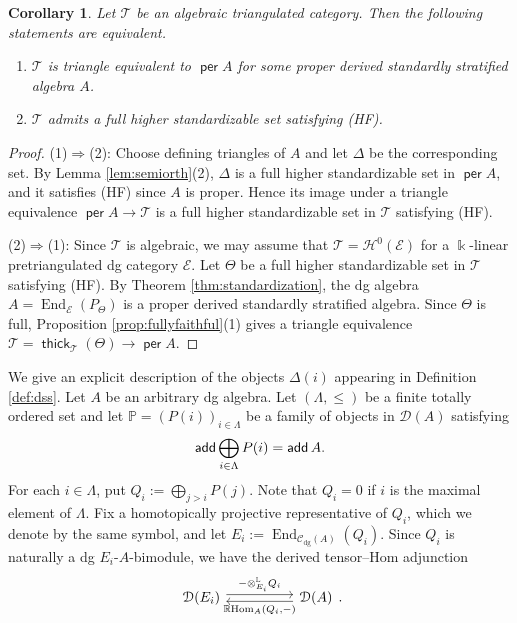 \documentclass[a4paper,reqno,11pt]{amsart}
\numberwithin{equation}{section}
\newtheorem{corollary}[theorem]{Corollary}
\theoremstyle{definition}
\newcommand{\C}{\mathcal{C}}
\newcommand{\D}{\mathcal{D}}
\newcommand{\E}{\mathcal{E}}
\renewcommand{\H}{\mathcal{H}}
\newcommand{\T}{\mathcal{T}}
\newcommand{\LL}{\mathbb{L}}
\newcommand{\PP}{\mathbb{P}}
\newcommand{\bte}{\Theta}
\newcommand{\bde}{\Delta}
\newcommand{\kk}{\Bbbk}
\DeclareMathOperator{\add}{\mathsf{add}}
\DeclareMathOperator{\thick}{\mathsf{thick}}
\DeclareMathOperator{\per}{\mathsf{per}}
\DeclareMathOperator{\End}{End}
\DeclareMathOperator{\RHom}{\mathbb{R}Hom}
\newcommand{\dgmod}{\C_{\mathrm{dg}}}
\begin{document}
\begin{corollary}\label{cor:tri_char}
Let $\T$ be an algebraic triangulated category.
Then the following statements are equivalent.
\begin{enumerate}
\item $\T$ is triangle equivalent to $\per A$ for some proper derived standardly stratified algebra $A$.
\item $\T$ admits a full higher standardizable set satisfying (HF).
\end{enumerate}
\end{corollary}
\begin{proof}
(1)$\Rightarrow$(2): Choose defining triangles of $A$ and let $\bde$ be the corresponding set. 
By Lemma \ref{lem:semiorth}(2), $\bde$ is a full higher standardizable set in $\per A$, and it satisfies (HF) since $A$ is proper.
Hence its image under a triangle equivalence $\per A\to\T$ is a full higher standardizable set in $\T$ satisfying (HF).

(2)$\Rightarrow$(1): Since $\T$ is algebraic, we may assume that $\T=\H^{0}(\E)$ for a $\kk$-linear pretriangulated dg category $\E$.
Let $\bte$ be a full higher standardizable set in $\T$ satisfying (HF).
By Theorem \ref{thm:standardization}, the dg algebra $A=\End_{\E}(P_{\bte})$ is a proper derived standardly stratified algebra.
Since $\bte$ is full, Proposition \ref{prop:fullyfaithful}(1) gives a triangle equivalence $\T=\thick_{\T}(\bte)\to\per A$.
\end{proof}

We give an explicit description of the objects $\bde(i)$ appearing in Definition \ref{def:dss}.
Let $A$ be an arbitrary dg algebra.
Let $(\Lambda,\leq)$ be a finite totally ordered set and let $\PP=(P(i))_{i\in\Lambda}$ be a family of objects in $\D(A)$ satisfying
\begin{align}
\add\bigoplus_{i\in\Lambda}P(i)=\add A.\notag
\end{align}
For each $i\in\Lambda$, put $Q_{i}:=\bigoplus_{j>i}P(j)$.
Note that $Q_{i}=0$ if $i$ is the maximal element of $\Lambda$.
Fix a homotopically projective representative of $Q_{i}$, which we denote by the same symbol, and let $E_{i}:=\End_{\dgmod(A)}(Q_{i})$.
Since $Q_{i}$ is naturally a dg $E_{i}$-$A$-bimodule, we have the derived tensor--Hom adjunction
\[
\begin{tikzcd}
\D(E_{i})\ar[rr, shift left, "{-\otimes_{E_{i}}^{\LL}Q_{i}}"]&&\D(A)\ar[ll, shift left, "{\RHom_{A}(Q_{i},-)}"]
\end{tikzcd}.
\]
\end{document}
